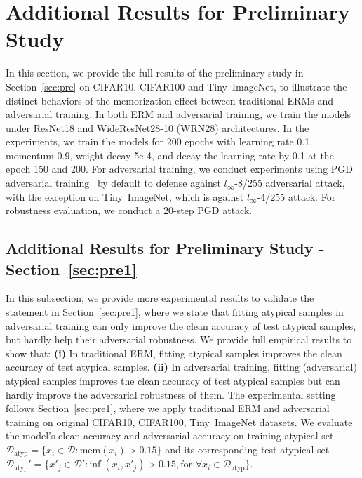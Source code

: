 
\section{Additional Results for Preliminary Study}\label{app:pre}

In this section, we provide the full results of the preliminary study in Section~\ref{sec:pre} 
on CIFAR10, CIFAR100 and Tiny~ImageNet, to illustrate the distinct behaviors of the memorization effect between traditional ERMs and adversarial training. In both ERM and adversarial training, we train the models under ResNet18 and WideResNet28-10 (WRN28) architectures. In the experiments, we train the models for 200 epochs with learning rate 0.1, momentum 0.9, weight decay 5e-4, and decay the learning rate by 0.1 at the epoch 150 and 200. For adversarial training, we conduct experiments using PGD adversarial training~\cite{madry2017towards} by default to defense against $l_\infty$-8/255 adversarial attack, with the exception on Tiny~ImageNet, which is against $l_\infty$-4/255 attack. For robustness evaluation, we conduct a 20-step PGD attack.


\subsection{Additional Results for Preliminary Study - Section~\ref{sec:pre1}}\label{app:pre1}

In this subsection, we provide more experimental results to validate the statement 
in Section~\ref{sec:pre1}, where we state that fitting atypical samples in adversarial training can only improve the clean accuracy of test atypical samples, but hardly help their adversarial robustness. We provide full empirical results to show that: \textbf{(i)} In traditional ERM, fitting atypical samples improves the clean accuracy of test atypical samples. \textbf{(ii)} In adversarial training, fitting (adversarial) atypical samples improves the clean accuracy of test atypical samples but can hardly improve the adversarial robustness of them. The experimental setting follows Section~\ref{sec:pre1}, where we apply traditional ERM and adversarial training on original CIFAR10, CIFAR100, Tiny~ImageNet datasets. We evaluate the model's clean accuracy and adversarial accuracy on training atypical set $\mathcal{D}_\text{atyp}=\{x_i \in \mathcal{D}: \text{mem}(x_i)> 0.15\}$ and its corresponding test atypical set $\mathcal{D}_\text{atyp}' = \{x'_j \in \mathcal{D}': \text{infl}(x_i,x'_j)> 0.15, \text{for } \forall x_i\in \mathcal{D}_\text{atyp}\}$.



